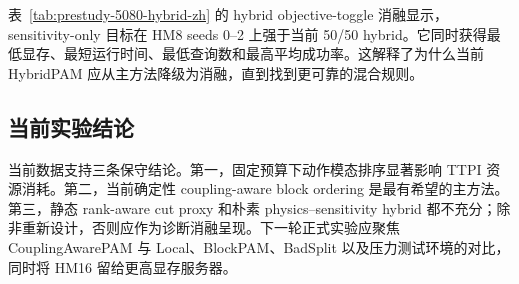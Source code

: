 \begin{table}[t]
\centering
\caption{HM8 seeds 0--2 上的低成本 empirical sensitivity 候选。二者均可完成，但秩、显存和查询负担过高，不适合扩展到 HM12。}
\resizebox{\columnwidth}{!}{}
\label{tab:prestudy-5080-lite-zh}
\end{table}

表~\ref{tab:prestudy-5080-hybrid-zh} 的 hybrid objective-toggle 消融显示，sensitivity-only
目标在 HM8 seeds 0--2 上强于当前 50/50 hybrid。它同时获得最低显存、最短运行时间、最低查询数和最高平均成功率。这解释了为什么当前 HybridPAM 应从主方法降级为消融，直到找到更可靠的混合规则。

\begin{table}[t]
\centering
\caption{HM8 seeds 0--2 上的 hybrid 目标开关消融。除排序目标外，TTPI 训练配置保持不变。}
\resizebox{\columnwidth}{!}{}
\label{tab:prestudy-5080-hybrid-zh}
\end{table}

\subsection{当前实验结论}

当前数据支持三条保守结论。第一，固定预算下动作模态排序显著影响 TTPI 资源消耗。第二，当前确定性 coupling-aware block ordering 是最有希望的主方法。第三，静态 rank-aware cut proxy 和朴素 physics--sensitivity hybrid 都不充分；除非重新设计，否则应作为诊断消融呈现。下一轮正式实验应聚焦 CouplingAwarePAM 与 Local、BlockPAM、BadSplit 以及压力测试环境的对比，同时将 HM16 留给更高显存服务器。
